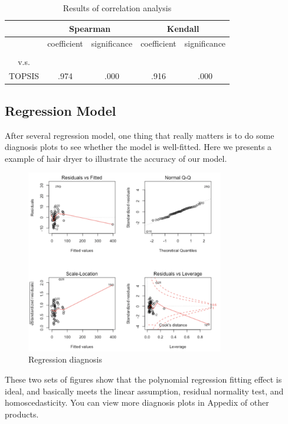 \documentclass{mcmthesis}
\begin{document}
\begin{longtable}[c]{ccccc}
\caption{Results of correlation analysis}\\
\toprule
                                                            & \multicolumn{2}{c}{Spearman} & \multicolumn{2}{c}{Kendall} \\
\endhead
\bottomrule
\endfoot
                                                            & coefficient  & significance  & coefficient  & significance \\ \hline
\begin{tabular}[c]{@{}c@{}}EWM \\ v.s.\\  TOPSIS\end{tabular} & .974         & .000          & .916         & .000         \\
\end{longtable}

\subsection{Regression Model}
\quad \quad After several regression model, one thing that really matters is to do some diagnosis plots to see whether the model is well-fitted. Here we presents a example of hair dryer to illustrate the accuracy of our model.
\begin{figure}[H] 
\centering
\includegraphics[width=.9\textwidth,height=8cm]{figures/qq.png}
\caption{Regression diagnosis}
\end{figure}
\quad These two sets of figures show that the polynomial regression fitting effect is ideal, and basically meets the linear assumption, residual normality test, and homoscedasticity. You can view more diagnosis plots in Appedix of other products.
\end{document}
